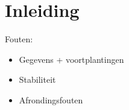 \documentclass[samenvatting.tex]{subfiles}
\begin{document}
\chapter{Inleiding}
Fouten:
\begin{itemize}
\item Gegevens + voortplantingen
\item Stabiliteit
\item Afrondingsfouten
\end{itemize}
\end{document}
